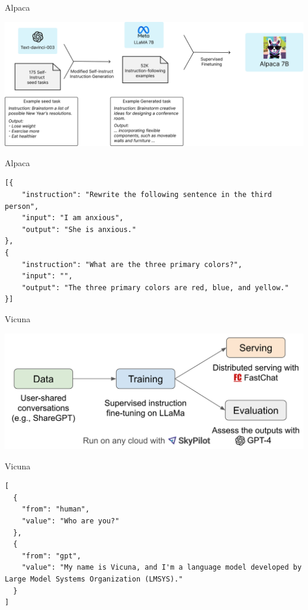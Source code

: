 \documentclass[aspectratio=1610,xcolor={dvipsnames},hyperref={colorlinks,unicode,linkcolor=violet,anchorcolor=BlueViolet,citecolor=YellowOrange,filecolor=black,urlcolor=Aquamarine}]{beamer}
\begin{document}
\begin{frame}[label={sec:orgb8281ab}]{Alpaca}
\begin{center}
\includegraphics[width=.9\linewidth]{./p4.jpg}
\end{center}
\end{frame}

\begin{frame}[label={sec:org5969e36},fragile]{Alpaca}
 \begin{verbatim}
[{
    "instruction": "Rewrite the following sentence in the third person",
    "input": "I am anxious",
    "output": "She is anxious."
},
{
    "instruction": "What are the three primary colors?",
    "input": "",
    "output": "The three primary colors are red, blue, and yellow."
}]
\end{verbatim}
\end{frame}

\begin{frame}[label={sec:orgf626b32}]{Vicuna}
\begin{center}
\includegraphics[width=.9\linewidth]{./p5.png}
\end{center}
\end{frame}

\begin{frame}[label={sec:org25a3b38},fragile]{Vicuna}
 \begin{verbatim}
[
  {
    "from": "human",
    "value": "Who are you?"
  },
  {
    "from": "gpt",
    "value": "My name is Vicuna, and I'm a language model developed by Large Model Systems Organization (LMSYS)."
  }
]
\end{verbatim}
\end{frame}
\end{document}
